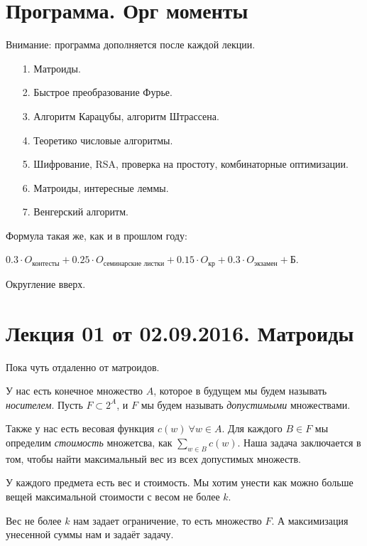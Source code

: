 \documentclass[a4paper, 12pt]{article}
\begin{document}
\pagestyle{fancy}

\section{Программа. Орг моменты}

Внимание: программа дополняется после каждой лекции.
\begin{itemize}
  \item[1.] Матроиды.
  \item[2.] Быстрое преобразование Фурье.
  \item[3.] Алгоритм Карацубы, алгоритм Штрассена.
  \item[4.] Теоретико числовые алгоритмы.
  \item[5.] Шифрование, RSA, проверка на простоту, комбинаторные 
  оптимизации.
  \item[6.] Матроиды, интересные леммы.
  \item[7.] Венгерский алгоритм.
\end{itemize}

Формула такая же, как и в прошлом году: 

$0.3\cdot O_{\text{контесты}} + 0.25
\cdot O_{\text{семинарские листки}} + 0.15 \cdot O_{\text{кр}} + 0.3\cdot 
O_{\text{экзамен}} + \text{Б}$.

 Округление вверх.

\section{Лекция 01 от 02.09.2016. Матроиды}

Пока чуть отдаленно от матроидов.

У нас есть конечное множество $A$, которое в будущем мы будем называть 
\textit{носителем}. Пусть $F \subset 2^{A}$, и $F$ мы будем называть 
\textit{допустимыми} множествами.

Также у нас есть весовая функция $c(w) \ \forall w \in A$. 
Для каждого $B \in F$ мы определим \textit{стоимость} 
множетсва, как $\sum\limits_{w \in B} c(w)$. Наша задача 
заключается в том, чтобы найти максимальный вес из всех допустимых множеств.

\begin{Examples}
У каждого предмета есть вес и стоимость. Мы хотим унести как можно больше 
вещей максимальной стоимости с весом не более $k$.

Вес не более $k$ нам задает ограничение, то есть множество $F$.
А максимизация унесенной суммы нам и задаёт задачу.
\end{Examples}
\end{document}
